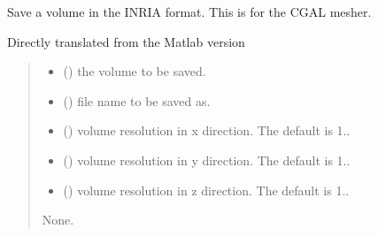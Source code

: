 \documentclass[letterpaper,10pt,english]{sphinxmanual}
\begin{document}
\begin{fulllineitems}
\label{\detokenize{_autosummary/nirfasterff.io.saveinr:nirfasterff.io.saveinr}}
\pysigstartsignatures
{}
\pysigstopsignatures
\sphinxAtStartPar
Save a volume in the INRIA format. This is for the CGAL mesher.

\sphinxAtStartPar
Directly translated from the Matlab version
\begin{quote}\begin{description}
\begin{itemize}
\item {} 
\sphinxAtStartPar
{} () \textendash{} the volume to be saved.

\item {} 
\sphinxAtStartPar
{} () \textendash{} file name to be saved as.

\item {} 
\sphinxAtStartPar
{} (\sphinxstyleliteralemphasis{\sphinxupquote{, }}) \textendash{} volume resolution in x direction. The default is 1..

\item {} 
\sphinxAtStartPar
{} (\sphinxstyleliteralemphasis{\sphinxupquote{, }}) \textendash{} volume resolution in y direction. The default is 1..

\item {} 
\sphinxAtStartPar
{} (\sphinxstyleliteralemphasis{\sphinxupquote{, }}) \textendash{} volume resolution in z direction. The default is 1..

\end{itemize}

\sphinxAtStartPar
None.

\end{description}\end{quote}

\end{fulllineitems}
\end{document}
